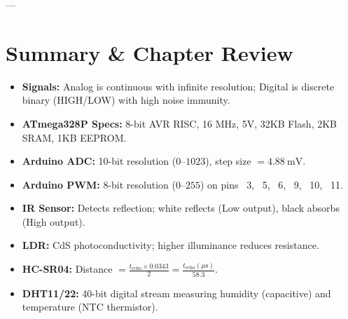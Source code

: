---

\section{Summary \& Chapter Review}
\begin{quickrevision}
\begin{itemize}
    \item \textbf{Signals:} Analog is continuous with infinite resolution; Digital is discrete binary (HIGH/LOW) with high noise immunity.
    \item \textbf{ATmega328P Specs:} 8-bit AVR RISC, 16 MHz, 5V, 32KB Flash, 2KB SRAM, 1KB EEPROM.
    \item \textbf{Arduino ADC:} 10-bit resolution ($0\text{--}1023$), step size $= \SI{4.88}{\milli\volt}$.
    \item \textbf{Arduino PWM:} 8-bit resolution ($0\text{--}255$) on pins ~3, ~5, ~6, ~9, ~10, ~11.
    \item \textbf{IR Sensor:} Detects reflection; white reflects (Low output), black absorbs (High output).
    \item \textbf{LDR:} CdS photoconductivity; higher illuminance reduces resistance.
    \item \textbf{HC-SR04:} Distance $= \frac{t_{\text{echo}} \times 0.0343}{2} = \frac{t_{\text{echo}}(\mu\text{s})}{58.3}$.
    \item \textbf{DHT11/22:} 40-bit digital stream measuring humidity (capacitive) and temperature (NTC thermistor).
\end{itemize}
\end{quickrevision}
